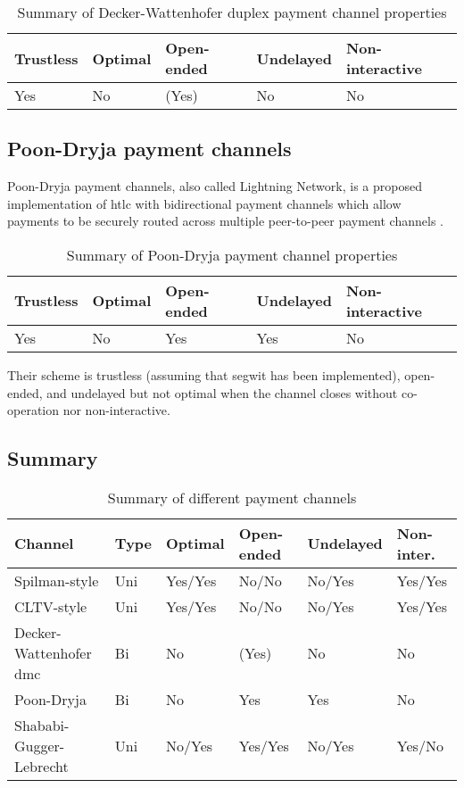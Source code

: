 \begin{table}[h]
  \begin{tabularx}{\textwidth}{ | X | l | l | l | X |}
  \hline
  Trustless & Optimal & Open-ended & Undelayed & Non-interactive \\ \hline \hline
  Yes & No & (Yes) & No & No \\
  \hline
  \end{tabularx}
  \caption{Summary of Decker-Wattenhofer duplex payment channel properties}
  \label{fig:summaryDeckerWattenhoferPaymentChannel}
\end{table}

\subsection{Poon-Dryja payment channels}

Poon-Dryja payment channels, also called Lightning Network, is a proposed
implementation of \gls{htlc} with bidirectional payment channels which allow
payments to be securely routed across multiple peer-to-peer payment channels
\cite{poon2016bitcoin}.

\begin{table}[h]
  \begin{tabularx}{\textwidth}{ | X | l | l | l | X |}
  \hline
  Trustless & Optimal & Open-ended & Undelayed & Non-interactive \\ \hline \hline
  Yes & No & Yes & Yes & No \\
  \hline
  \end{tabularx}
  \caption{Summary of Poon-Dryja payment channel properties}
  \label{fig:summaryPoonDryjaPaymentChannel}
\end{table}

Their scheme is trustless (assuming that \gls{segwit} has been implemented),
open-ended, and undelayed but not optimal when the channel closes without
co-operation nor non-interactive.

\subsection{Summary}

\begin{table}[h]
  \begin{tabularx}{\textwidth}{ | X | l | l | l | l | l |}
  \hline
  Channel & Type & Optimal & Open-ended & Undelayed & Non-inter. \\ \hline \hline
  Spilman-style & Uni & Yes/Yes & No/No & No/Yes & Yes/Yes \\ \hline
  CLTV-style & Uni & Yes/Yes & No/No & No/Yes & Yes/Yes \\ \hline
  Decker-Wattenhofer \gls{dmc} & Bi & No & (Yes) & No & No \\ \hline
  Poon-Dryja & Bi & No & Yes & Yes & No \\ \hline
  Shababi-Gugger-Lebrecht & Uni & No/Yes & Yes/Yes & No/Yes & Yes/No \\
  \hline
  \end{tabularx}
  \caption{Summary of different payment channels}
  \label{fig:summaryPaymentChannel}
\end{table}

